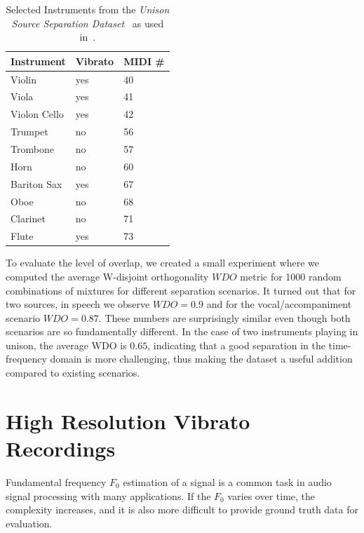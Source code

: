 \begin{table}
\begin{center}
\footnotesize
\begin{tabular}{ l l l}
  \toprule
  Instrument & Vibrato &  MIDI \# \\
  \midrule
  Violin & yes & 40 \\
  Viola & yes & 41 \\
  Violon Cello & yes & 42 \\
  Trumpet & no & 56 \\
  Trombone & no & 57\\
  Horn & no & 60  \\
  Bariton Sax & yes & 67 \\
  Oboe & no & 68\\
  Clarinet & no & 71\\
  Flute & yes & 73\\
  \bottomrule
\end{tabular}
\end{center}
\caption{Selected Instruments from the \emph{Unison Source Separation Dataset}~\cite{oss_unison} as used in~\cite{stoeter14, stoeter16}.}
\label{tab:testset}
\end{table}

To evaluate the level of overlap, we created a small experiment where we computed the average W-disjoint orthogonality \(WDO\) metric for 1000 random combinations of mixtures for different separation scenarios.
It turned out that for two sources, in speech we observe \(WDO=0.9\) and for the vocal/accompaniment scenario \(WDO=0.87\). 
These numbers are surprisingly similar even though both scenarios are so fundamentally different.
In the case of two instruments playing in unison, the average WDO is \(0.65\), indicating that a good separation in the time-frequency domain is more challenging, thus making the dataset a useful addition compared to existing scenarios.

\section{High Resolution Vibrato Recordings}%
\label{sec:muserc}


Fundamental frequency \(F_0\) estimation of a signal is a common task in audio signal processing with many applications. 
If the $F_0$ varies over time, the complexity increases, and it is also more difficult to provide ground truth data for evaluation.

